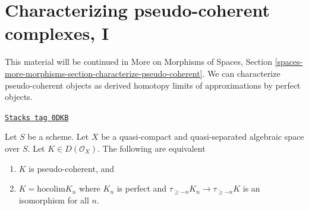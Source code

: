 \section{Characterizing pseudo-coherent complexes, I}
\label{spaces-perfect-section-pseudo-coherent-hocolim}
This material will be continued in More on Morphisms of Spaces, Section
\ref{spaces-more-morphisms-section-characterize-pseudo-coherent}.
We can characterize pseudo-coherent
objects as derived homotopy limits of approximations by perfect objects.

\begin{lemma}
\label{spaces-perfect-lemma-pseudo-coherent-hocolim}
\href{https://stacks.math.columbia.edu/tag/0DKB}{\texttt{Stacks tag 0DKB}}

Let $S$ be a scheme.
Let $X$ be a quasi-compact and quasi-separated algebraic space over $S$.
Let $K \in D(\mathcal{O}_X)$. The following are equivalent
\begin{enumerate}
\item $K$ is pseudo-coherent, and
\item $K = \text{hocolim} K_n$ where
$K_n$ is perfect and $\tau_{\geq -n}K_n \to \tau_{\geq -n}K$
is an isomorphism for all $n$.
\end{enumerate}
\end{lemma}

